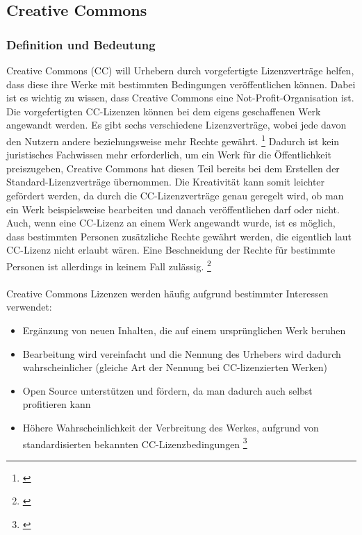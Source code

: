 \documentclass[titlepage,12pt,twoside]{article}
\begin{document}
\subsection{Creative Commons}
\subsubsection{Definition und Bedeutung}
Creative Commons (CC) will Urhebern durch vorgefertigte Lizenzverträge helfen, dass diese ihre Werke mit 
bestimmten Bedingungen veröffentlichen können. Dabei ist es wichtig zu wissen, dass Creative Commons eine 
Not-Profit-Organisation ist. Die vorgefertigten CC-Lizenzen können bei dem eigens geschaffenen Werk angewandt 
werden. Es gibt sechs verschiedene Lizenzverträge, wobei jede davon den Nutzern andere beziehungsweise mehr 
Rechte gewährt. \footnote{\cite{CreativeCommons35}}  Dadurch ist kein juristisches Fachwissen mehr erforderlich, um ein Werk für die 
Öffentlichkeit preiszugeben, Creative Commons hat diesen Teil bereits bei dem Erstellen der 
Standard-Lizenzverträge übernommen. Die Kreativität kann somit leichter gefördert werden, da durch die 
CC-Lizenzverträge genau geregelt wird, ob man ein Werk beispielsweise bearbeiten und danach veröffentlichen 
darf oder nicht. Auch, wenn eine CC-Lizenz an einem Werk angewandt wurde, ist es möglich, dass bestimmten 
Personen zusätzliche Rechte gewährt werden, die eigentlich laut CC-Lizenz nicht erlaubt wären. Eine 
Beschneidung der Rechte für bestimmte Personen ist allerdings in keinem Fall zulässig. \footnote{\cite{CreativeCommons36}} \\
\\
Creative Commons Lizenzen werden häufig aufgrund bestimmter Interessen verwendet: \\
\begin{itemize}
	\item Ergänzung von neuen Inhalten, die auf einem ursprünglichen Werk beruhen
	\item Bearbeitung wird vereinfacht und die Nennung des Urhebers wird dadurch wahrscheinlicher (gleiche Art der Nennung bei CC-lizenzierten Werken)
	\item Open Source unterstützen und fördern, da man dadurch auch selbst profitieren kann
	\item Höhere Wahrscheinlichkeit der Verbreitung des Werkes, aufgrund von standardisierten bekannten CC-Lizenzbedingungen \footnote{\cite{CreativeCommons37}}
\end{itemize}
\hfill \break
\end{document}
